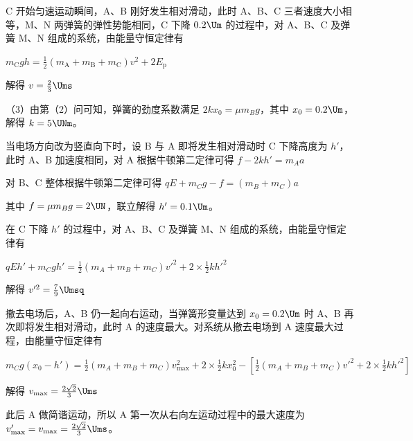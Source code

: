\documentclass[\gkver]{gaokaozhenti}
\begin{document}
\begin{enumerate}
{C 开始匀速运动瞬间，A、B 刚好发生相对滑动，此时 A、B、C 三者速度大小相等，M、N 两弹簧的弹性势能相同，C 下降 $0.2 \Um$ 的过程中，对 A、B、C 及弹簧 M、N 组成的系统，由能量守恒定律有

$m_{\mathrm{C}}gh = \frac{1}{2}(m_{\mathrm{A}} + m_{\mathrm{B}} + m_{\mathrm{C}})v^{2} + 2E_{\mathrm{p}}$

解得 $v = \frac{2}{3} \Ums$

（3）由第（2）问可知，弹簧的劲度系数满足 $2kx_{0} = \mu m_{B}g$，其中 $x_{0} = 0.2 \Um$，解得 $k = 5 \UNm$。

当电场方向改为竖直向下时，设 B 与 A 即将发生相对滑动时 C 下降高度为 $h'$，此时 A、B 加速度相同，对 A 根据牛顿第二定律可得 $f - 2kh' = m_{A}a$

对 B、C 整体根据牛顿第二定律可得 $qE + m_{C}g - f = (m_{B} + m_{C})a$

其中 $f = \mu m_{B}g = 2 \UN$，联立解得 $h' = 0.1 \Um$。

在 C 下降 $h'$ 的过程中，对 A、B、C 及弹簧 M、N 组成的系统，由能量守恒定律有

$qEh' + m_{C}gh' = \frac{1}{2}(m_{A} + m_{B} + m_{C})v'^{2} + 2 \times \frac{1}{2}kh'^{2}$

解得 $v'^{2} = \frac{7}{9} \Umsq$

撤去电场后，A、B 仍一起向右运动，当弹簧形变量达到 $x_{0} = 0.2 \Um$ 时 A、B 再次即将发生相对滑动，此时 A 的速度最大。对系统从撤去电场到 A 速度最大过程，由能量守恒定律有

$m_{C}g(x_{0} - h') = \frac{1}{2}(m_{A} + m_{B} + m_{C})v_{\text{max}}^{2} + 2 \times \frac{1}{2}kx_{0}^{2} - \left[\frac{1}{2}(m_{A} + m_{B} + m_{C})v'^{2} + 2 \times \frac{1}{2}kh'^{2}\right]$

解得 $v_{\text{max}} = \frac{2\sqrt{2}}{3} \Ums$

此后 A 做简谐运动，所以 A 第一次从右向左运动过程中的最大速度为 $v_{\text{max}}' = v_{\text{max}} = \frac{2\sqrt{2}}{3} \Ums$。
}

\end{enumerate}
\end{document}

